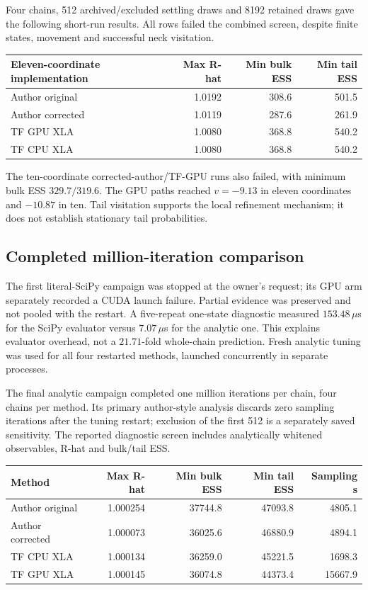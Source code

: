 Four chains, 512 archived/excluded settling draws and 8192 retained draws
gave the following short-run results. All rows failed the combined screen,
despite finite states, movement and successful neck visitation.

\begin{center}\small
\begin{tabular}{lrrr}
\toprule
Eleven-coordinate implementation & Max R-hat & Min bulk ESS & Min tail ESS\\
\midrule
Author original & 1.0192 & 308.6 & 501.5\\
Author corrected & 1.0119 & 287.6 & 261.9\\
TF GPU XLA & 1.0080 & 368.8 & 540.2\\
TF CPU XLA & 1.0080 & 368.8 & 540.2\\
\bottomrule
\end{tabular}
\end{center}

The ten-coordinate corrected-author/TF-GPU runs also failed, with minimum
bulk ESS $329.7/319.6$. The GPU paths reached $v=-9.13$ in eleven
coordinates and $-10.87$ in ten. Tail visitation supports the local
refinement mechanism; it does not establish stationary tail probabilities.

\subsection{Completed million-iteration comparison}

The first literal-SciPy campaign was stopped at the owner's request; its
GPU arm separately recorded a CUDA launch failure. Partial evidence was
preserved and not pooled with the restart. A five-repeat one-state
diagnostic measured $153.48\,\mu$s for the SciPy evaluator versus
$7.07\,\mu$s for the analytic one. This explains evaluator overhead,
not a $21.71$-fold whole-chain prediction. Fresh analytic tuning was used
for all four restarted methods, launched concurrently in separate processes.

The final analytic campaign completed one million iterations per chain,
four chains per method. Its primary author-style analysis discards zero
sampling iterations after the tuning restart; exclusion of the first
512 is a separately saved sensitivity. The reported diagnostic screen
includes analytically whitened observables, R-hat and bulk/tail ESS.

\begin{center}\small
\begin{tabular}{lrrrr}
\toprule
Method & Max R-hat & Min bulk ESS & Min tail ESS & Sampling s\\
\midrule
Author original & 1.000254 & 37744.8 & 47093.8 & 4805.1\\
Author corrected & 1.000073 & 36025.6 & 46880.9 & 4894.1\\
TF CPU XLA & 1.000134 & 36259.0 & 45221.5 & 1698.3\\
TF GPU XLA & 1.000145 & 36074.8 & 44373.4 & 15667.9\\
\bottomrule
\end{tabular}
\end{center}

